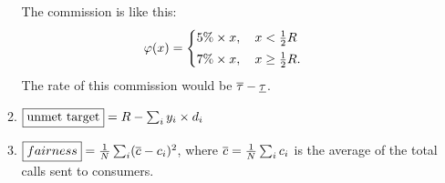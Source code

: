 \documentclass[a4paper]{article}
\begin{document}
\begin{enumerate}
\begin{enumerate}
    The commission is like this:
    \begin{equation}
      \com(x) = 
      \begin{cases}
        5\% \times x, \quad x < \frac12 \target \vspace{0.1cm}\\
        7\% \times x, \quad x \ge \frac12 \target.
      \end{cases}
    \end{equation}
    The rate of this commission would be $\overline{\tau} - \underline{\tau}$.
    \item $\boxed{\text{unmet target}} = R - \sum_{i} y_{i} \times d_{i}$
    \item $\boxed{fairness} = \frac{1}{N} \sum_{i} (\overline{c} - c_{i})^2$, where $\overline{c} = \frac{1}{N} \sum_{i} c_{i}$ is the average of the total calls sent to consumers.
  \end{enumerate}
\end{enumerate}
\end{document}
